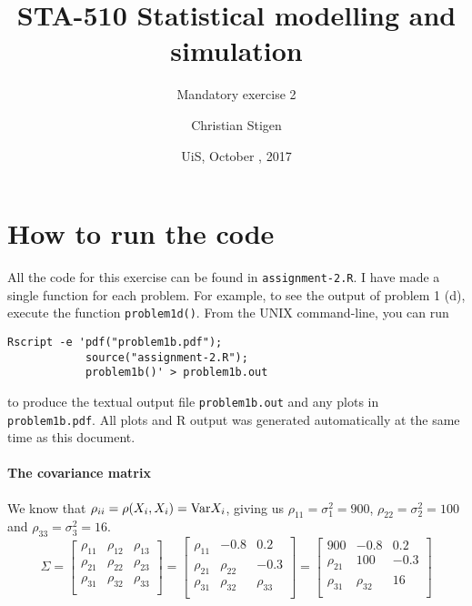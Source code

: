 \documentclass[a4paper,english,12pt]{article}
\title{STA-510 Statistical modelling and simulation}
\subtitle{Mandatory exercise 2}
\author{Christian Stigen}
\date{UiS, October \nth{19}, 2017}
\begin{document}
  \maketitle
\section*{\normalsize{How to run the code}}
All the code for this exercise can be found in \texttt{assignment-2.R}. I have
made a single function for each problem. For example, to see the output of
problem 1 (d), execute the function \texttt{problem1d()}.  From the UNIX
command-line, you can run
\begin{verbatim}
Rscript -e 'pdf("problem1b.pdf");
            source("assignment-2.R");
            problem1b()' > problem1b.out
\end{verbatim}
to produce the textual output file \texttt{problem1b.out} and any plots in
\texttt{problem1b.pdf}. All plots and R output was generated automatically at
the same time as this document.

\paragraph{The covariance matrix}
We know that $\rho_{ii} = \rho(X_i, X_i) = \mathrm{Var}{X_i}$, giving us
$\rho_{11} = \sigma_1^2 = 900$, $\rho_{22} = \sigma_2^2 = 100$ and $\rho_{33}
= \sigma_3^2 = 16$.
\[
  \Sigma =
    \begin{bmatrix}
      \rho_{11} & \rho_{12} & \rho_{13} \\
      \rho_{21} & \rho_{22} & \rho_{23} \\
      \rho_{31} & \rho_{32} & \rho_{33} \\
    \end{bmatrix}
  =
    \begin{bmatrix}
      \rho_{11} & -0.8 & 0.2 \\
      \rho_{21} & \rho_{22} & -0.3 \\
      \rho_{31} & \rho_{32} & \rho_{33} \\
    \end{bmatrix}
  =
    \begin{bmatrix}
      900 & -0.8 & 0.2 \\
      \rho_{21} & 100 & -0.3 \\
      \rho_{31} & \rho_{32} & 16 \\
    \end{bmatrix}
\]

\cite{walpole}

\clearpage


\end{document}
